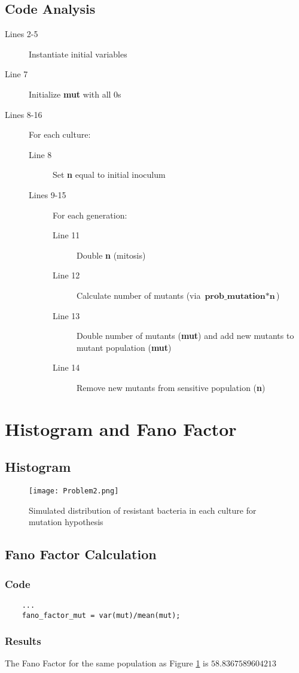 \documentclass[titlepage]{scrartcl}
\begin{document}
\subsection{Code Analysis}
\begin{description}
    \item[Lines 2-5] Instantiate initial variables
    \item[Line 7] Initialize \textbf{mut} with all 0s
    \item[Lines 8-16] For each culture:
    \begin{description}
        \item[Line 8] Set \textbf{n} equal to initial inoculum
        \item[Lines 9-15] For each generation:
        \begin{description}
            \item[Line 11] Double \textbf{n} (mitosis)
            \item[Line 12] Calculate number of mutants (via $\textbf{prob\_mutation}*\textbf{n}$)
            \item[Line 13] Double number of mutants (\textbf{mut}) and add new mutants to mutant population (\textbf{mut})
            \item[Line 14] Remove new mutants from sensitive population (\textbf{n})
        \end{description}
    \end{description}
\end{description}
\section{Histogram and Fano Factor}
\subsection{Histogram}
\begin{figure}[h]
    \centering
    \texttt{[image: Problem2.png]}
    \caption{Simulated distribution of resistant bacteria in each culture for mutation hypothesis}
    \label{fig:problem2_histogram}
\end{figure}
\subsection{Fano Factor Calculation}
\subsubsection{Code}
\begin{verbatim}
    ...
    fano_factor_mut = var(mut)/mean(mut);    
\end{verbatim}
\subsubsection{Results}
The Fano Factor for the same population as Figure \ref{fig:problem2_histogram} is $58.8367589604213$
\end{document}
